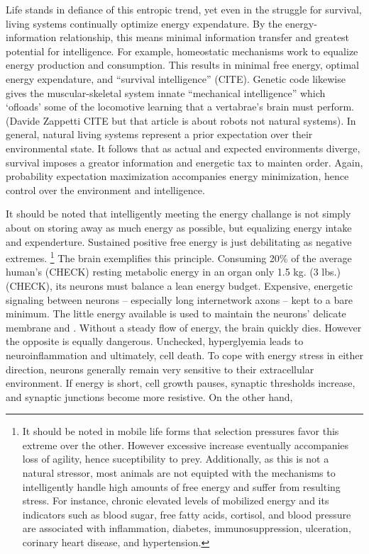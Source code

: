 \documentclass{article}
\begin{document}
Life stands in defiance of this entropic trend, yet even in the struggle for survival, living systems continually optimize energy expendature. By the energy-information relationship, this means minimal information transfer and greatest potential for intelligence. For example, homeostatic mechanisms work to equalize energy production and consumption. This results in minimal free energy, optimal energy expendature, and ``survival intelligence'' (CITE). Genetic code likewise gives the muscular-skeletal system innate ``mechanical intelligence'' which `ofloads' some of the locomotive learning that a vertabrae's brain must perform. (Davide Zappetti CITE but that article is about robots not natural systems). In general, natural living systems represent a prior expectation over their environmental state. It follows that as actual and expected environments diverge, survival imposes a greator information and energetic tax to mainten order. Again, probability expectation maximization accompanies energy minimization, hence control over the environment and intelligence.

It should be noted that intelligently meeting the energy challange is not simply about on storing away as much energy as possible, but equalizing energy intake and expenderture. Sustained positive free energy is just debilitating as negative extremes. \footnote{It should be noted in mobile life forms that selection pressures favor this extreme over the other. However excessive increase eventually accompanies loss of agility, hence suceptibility to prey. Additionally, as this is not a natural stressor, most animals are not equipted with the mechanisms to intelligently handle high amounts of free energy and suffer from resulting stress. For instance, chronic elevated levels of mobilized energy and its indicators such as blood sugar, free fatty acids, cortisol, and blood pressure are associated with inflammation, diabetes, immunosuppression, ulceration, corinary heart disease, and hypertension.} The brain exemplifies this principle. Consuming 20\% of the average human's (CHECK) resting metabolic energy in an organ only 1.5 kg. (3 lbs.) (CHECK), its neurons must balance a lean energy budget. Expensive, energetic signaling between neurons -- especially long internetwork axons -- kept to a bare minimum. The little energy available is used to maintain the neurons' delicate membrane and . Without a steady flow of energy, the brain quickly dies. However the opposite is equally dangerous. Unchecked, hyperglyemia leads to neuroinflammation and ultimately, cell death. To cope with energy stress in either direction, neurons generally remain very sensitive to their extracellular environment. If energy is short, cell growth pauses, synaptic thresholds increase, and synaptic junctions become more resistive. On the other hand, 
\end{document}
